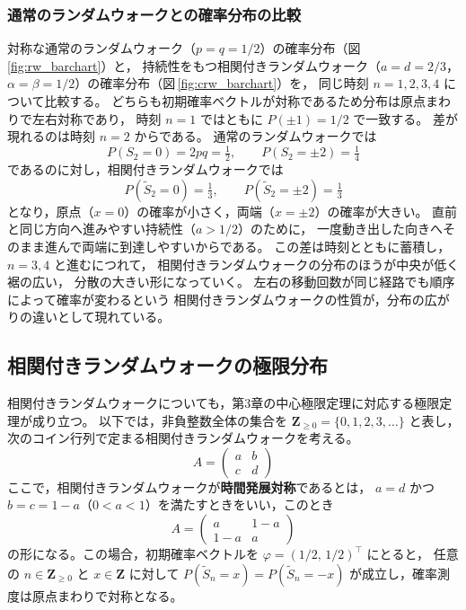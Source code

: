 \documentclass[a4j,dvipdfmx]{jsarticle}
\theoremstyle{plainnote}
\begin{document}
\subsubsection*{通常のランダムウォークとの確率分布の比較}

対称な通常のランダムウォーク（$p=q=1/2$）の確率分布（図\,\ref{fig:rw_barchart}）と，
持続性をもつ相関付きランダムウォーク（$a=d=2/3$，$\alpha=\beta=1/2$）の確率分布（図\,\ref{fig:crw_barchart}）を，
同じ時刻 $n=1,2,3,4$ について比較する。
どちらも初期確率ベクトルが対称であるため分布は原点まわりで左右対称であり，
時刻 $n=1$ ではともに $P(\pm 1)=1/2$ で一致する。
差が現れるのは時刻 $n=2$ からである。
通常のランダムウォークでは
\[
  P(S_2=0)=2pq=\tfrac{1}{2}, \qquad P(S_2=\pm 2)=\tfrac{1}{4}
\]
であるのに対し，相関付きランダムウォークでは
\[
  P(\tilde{S}_2=0)=\tfrac{1}{3}, \qquad P(\tilde{S}_2=\pm 2)=\tfrac{1}{3}
\]
となり，原点（$x=0$）の確率が小さく，両端（$x=\pm 2$）の確率が大きい。
直前と同じ方向へ進みやすい持続性（$a>1/2$）のために，
一度動き出した向きへそのまま進んで両端に到達しやすいからである。
この差は時刻とともに蓄積し，$n=3,4$ と進むにつれて，
相関付きランダムウォークの分布のほうが中央が低く裾の広い，
分散の大きい形になっていく。
左右の移動回数が同じ経路でも順序によって確率が変わるという
相関付きランダムウォークの性質が，分布の広がりの違いとして現れている。

\subsection{相関付きランダムウォークの極限分布}

相関付きランダムウォークについても，第3章の中心極限定理に対応する極限定理が成り立つ。
以下では，非負整数全体の集合を
$\mathbf{Z}_{\geq 0}=\{0,1,2,3,\ldots\}$
と表し，次のコイン行列で定まる相関付きランダムウォークを考える。
\begin{equation}
  A = \begin{pmatrix} a & b \\ c & d \end{pmatrix}
\end{equation}
ここで，相関付きランダムウォークが\textbf{時間発展対称}であるとは，
$a = d$ かつ $b = c = 1 - a$（$0 < a < 1$）を満たすときをいい，このとき
\begin{equation}
  A = \begin{pmatrix} a & 1-a \\ 1-a & a \end{pmatrix}
  \label{eq:sym_corr_matrix}
\end{equation}
の形になる。この場合，初期確率ベクトルを $\varphi = (1/2,\,1/2)^\top$ にとると，
任意の $n \in \mathbf{Z}_{\geq 0}$ と $x \in \mathbf{Z}$ に対して
$P(\tilde{S}_n = x) = P(\tilde{S}_n = -x)$ が成立し，確率測度は原点まわりで対称となる。
\end{document}
